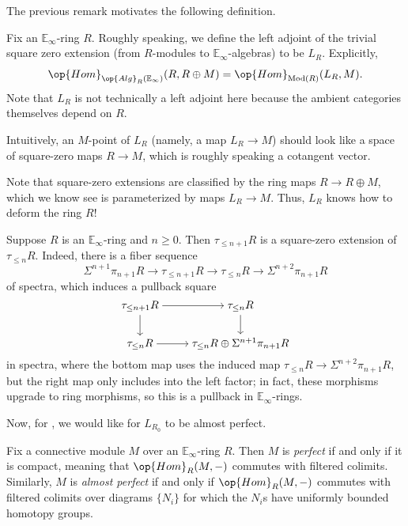 \documentclass[../notes.tex]{subfiles}
\begin{document}
The previous remark motivates the following definition.
\begin{definition}
	Fix an $\mathbb E_\infty$-ring $R$. Roughly speaking, we define the left adjoint of the trivial square zero extension (from $R$-modules to $\mathbb E_\infty$-algebras) to be $L_R$. Explicitly,
	\[\op{Hom}_{\op{Alg}_R(\mathbb E_\infty)}(R,R\oplus M)=\op{Hom}_{\mathrm{Mod}(R)}(L_R,M).\]
	Note that $L_R$ is not technically a left adjoint here because the ambient categories themselves depend on $R$.
\end{definition}
\begin{remark}
	Intuitively, an $M$-point of $L_R$ (namely, a map $L_R\to M$) should look like a space of square-zero maps $R\to M$, which is roughly speaking a cotangent vector.
\end{remark}
\begin{remark}
	Note that square-zero extensions are classified by the ring maps $R\to R\oplus M$, which we know see is parameterized by maps $L_R\to M$. Thus, $L_R$ knows how to deform the ring $R$!
\end{remark}
\begin{example}
	Suppose $R$ is an $\mathbb E_\infty$-ring and $n\ge0$. Then $\tau_{\le n+1}R$ is a square-zero extension of $\tau_{\le n}R$. Indeed, there is a fiber sequence
	\[\Sigma^{n+1}\pi_{n+1}R\to\tau_{\le n+1}R\to\tau_{\le n}R\to\Sigma^{n+2}\pi_{n+1}R\]
	of spectra, which induces a pullback square
	\[\begin{tikzcd}[cramped]
		{\tau_{\le n+1}R} & {\tau_{\le n}R} \\
		{\tau_{\le n}R} & {\tau_{\le n}R\oplus\Sigma^{n+1}\pi_{n+1}R}
		\arrow[from=1-1, to=1-2]
		\arrow[from=1-1, to=2-1]
		\arrow[from=1-2, to=2-2]
		\arrow[from=2-1, to=2-2]
	\end{tikzcd}\]
	in spectra, where the bottom map uses the induced map $\tau_{\le n}R\to\Sigma^{n+2}\pi_{n+1}R$, but the right map only includes into the left factor; in fact, these morphisms upgrade to ring morphisms, so this is a pullback in $\mathbb E_\infty$-rings.
\end{example}
Now, for , we would like for $L_{R_0}$ to be almost perfect.
\begin{definition}
	Fix a connective module $M$ over an $\mathbb E_\infty$-ring $R$. Then $M$ is \textit{perfect} if and only if it is compact, meaning that $\op{Hom}_R(M,-)$ commutes with filtered colimits. Similarly, $M$ is \textit{almost perfect} if and only if $\op{Hom}_R(M,-)$ commutes with filtered colimits over diagrams $\{N_i\}$ for which the $N_i$s have uniformly bounded homotopy groups.
\end{definition}
\end{document}
